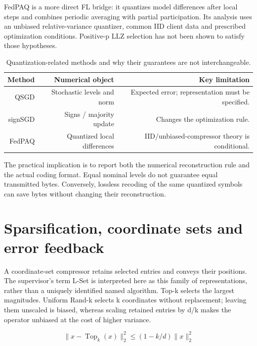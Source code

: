 FedPAQ is a more direct FL bridge: it quantizes model differences after local steps and combines periodic averaging with partial participation. Its analysis uses an unbiased relative-variance quantizer, common IID client data and prescribed optimization conditions. Positive-p LLZ selection has not been shown to satisfy those hypotheses. \parencite{reisizadeh2020fedpaq}

\begin{table}[htbp]
\centering
\small
\begin{tabularx}{\textwidth}{R{0.57000}R{0.96000}R{1.47000}}
\toprule
\textbf{Method} & \textbf{Numerical object} & \textbf{Key limitation} \\\midrule
QSGD & Stochastic levels and norm & Expected error; representation must be specified. \parencite{alistarh2017qsgd} \\
signSGD & Signs / majority update & Changes the optimization rule. \parencite{bernstein2018signsgd} \\
FedPAQ & Quantized local differences & IID/unbiased-compressor theory is conditional. \parencite{reisizadeh2020fedpaq} \\
\bottomrule
\end{tabularx}
\caption{Quantization-related methods and why their guarantees are not interchangeable.}
\label{tab:quantization}
\end{table}

The practical implication is to report both the numerical reconstruction rule and the actual coding format. Equal nominal levels do not guarantee equal transmitted bytes. Conversely, lossless recoding of the same quantized symbols can save bytes without changing their reconstruction.

\section{Sparsification, coordinate sets and error feedback}

A coordinate-set compressor retains selected entries and conveys their positions. The supervisor's term L-Set is interpreted here as this family of representations, rather than a uniquely identified named algorithm. Top-k selects the largest magnitudes. Uniform Rand-k selects k coordinates without replacement; leaving them unscaled is biased, whereas scaling retained entries by d/k makes the operator unbiased at the cost of higher variance. \parencite{stich2018memory}

\begin{equation*}\|x-\operatorname{Top}_k(x)\|_2^2 \leq (1-k/d)\|x\|_2^2\end{equation*}

